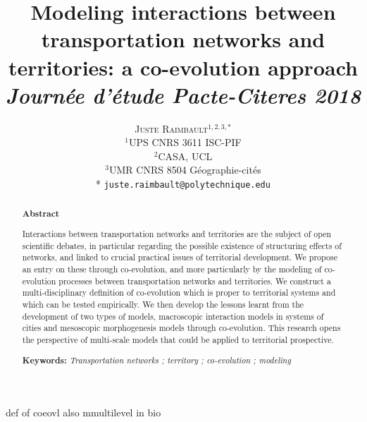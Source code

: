 \documentclass[11pt]{article}
\newcommand{\noun}[1]{\textsc{#1}}
\begin{document}
\title{
Modeling interactions between transportation networks and territories: a co-evolution approach
\bigskip\\
\textit{Journée d'étude Pacte-Citeres 2018\\
}
}
\author{\noun{Juste Raimbault}$^{1,2,3,*}$\medskip\\
$^1$UPS CNRS 3611 ISC-PIF\\
$^2$CASA, UCL\\
$^3$UMR CNRS 8504 Géographie-cités\medskip\\
* \texttt{juste.raimbault@polytechnique.edu}
}
\date{}

\maketitle

\justify





\medskip


\renewcommand{\abstractname}{}
\begin{abstract}
	\begin{center}
	\textbf{Abstract}
	\end{center}
	
	\medskip
	
	Interactions between transportation networks and territories are the subject of open scientific debates, in particular regarding the possible existence of structuring effects of networks, and linked to crucial practical issues of territorial development. We propose an entry on these through co-evolution, and more particularly by the modeling of co-evolution processes between transportation networks and territories. We construct a multi-disciplinary definition of co-evolution which is proper to territorial systems and which can be tested empirically. We then develop the lessons learnt from the development of two types of models, macroscopic interaction models in systems of cities and mesoscopic morphogenesis models through co-evolution. This research opens the perspective of multi-scale models that could be applied to territorial prospective.
	
	\medskip
	
	\textbf{Keywords: }\textit{Transportation networks ; territory ; co-evolution ; modeling}
	
\end{abstract}



\cite{carmona2015fifty} def of coeovl also mmultilevel in bio
\end{document}

